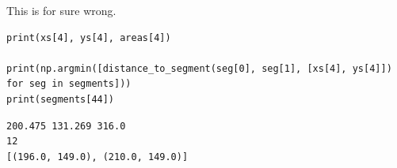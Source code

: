 \documentclass[11pt]{article}
\begin{document}
This is for sure wrong.
\begin{verbatim}
print(xs[4], ys[4], areas[4])

print(np.argmin([distance_to_segment(seg[0], seg[1], [xs[4], ys[4]]) for seg in segments]))
print(segments[44])
\end{verbatim}

\begin{verbatim}
200.475 131.269 316.0
12
[(196.0, 149.0), (210.0, 149.0)]
\end{verbatim}
\end{document}
